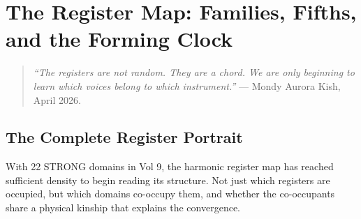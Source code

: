 \documentclass[11pt, letterpaper, openany]{book}
\begin{document}
\clearpage

\chapter{The Register Map: Families, Fifths, and the Forming Clock}

\begin{quote}
\textit{``The registers are not random. They are a chord. We are only beginning
to learn which voices belong to which instrument.''} --- Mondy Aurora Kish, April
2026.
\end{quote}

\section{The Complete Register Portrait}

With 22 STRONG domains in Vol 9, the harmonic register map has reached sufficient
density to begin reading its structure. Not just which registers are occupied, but
which domains co-occupy them, and whether the co-occupants share a physical kinship
that explains the convergence.
\end{document}

